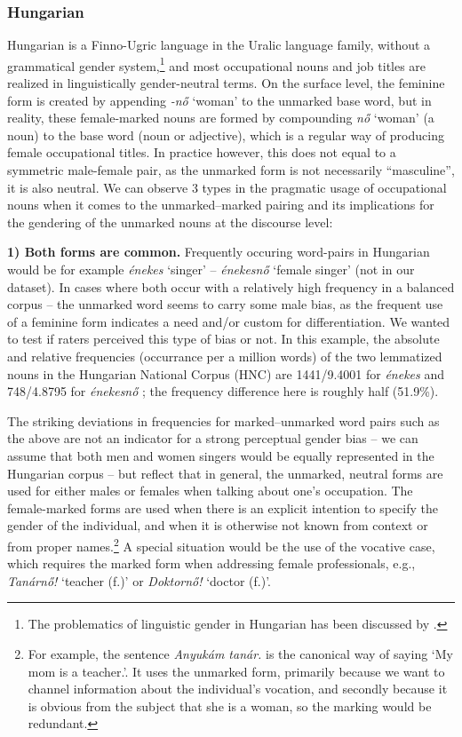 \documentclass[11pt]{article}
\begin{document}
\subsubsection{Hungarian}

Hungarian is a Finno-Ugric language in the Uralic language family, without a grammatical gender system,\footnote{The problematics of linguistic gender in Hungarian has been discussed by \citet{vasvari_2014_problemas}.} and most occupational nouns and job titles are realized in linguistically gender-neutral terms. 
On the surface level, the feminine form is created by appending \textit{-nő} `woman' to the unmarked base word, but in reality, these female-marked nouns are formed by compounding \textit{nő} `woman' (a noun) to the base word (noun or adjective), which is a regular way of producing female occupational titles. In practice however, this does not equal to a symmetric male-female pair, as the unmarked form is not necessarily ``masculine'', it is also neutral. We can observe 3 types in the pragmatic usage of occupational nouns when it comes to the unmarked--marked pairing and its implications for the gendering of the unmarked nouns at the discourse level:

\textbf{1) Both forms are common.} Frequently occuring word-pairs in Hungarian would be for example \textit{énekes} `singer' -- \textit{énekesnő} `female singer' (not in our dataset). In cases where both occur with a relatively high frequency in a balanced corpus -- the unmarked word seems to carry some male bias, as the frequent use of a feminine form indicates a need and/or custom for differentiation. We wanted to test if raters perceived this type of bias or not. In this example, the absolute and relative frequencies (occurrance per a million words) of the two lemmatized nouns in the Hungarian National Corpus (HNC) are 1441/9.4001 for \textit{énekes} and 748/4.8795 for \textit{énekesnő} \citep{varadi_2002_hungarian, oravecz_2014_hungarian}; the frequency difference here is roughly half (51.9\%).

The striking deviations in frequencies for marked--unmarked word pairs such as the above are not an indicator for a strong perceptual gender bias -- we can assume that both men and women singers would be equally represented in the Hungarian corpus -- but reflect that in general, the unmarked, neutral forms are used for either males or females when talking about one's occupation. The female-marked forms are used when there is an explicit intention to specify the gender of the individual, and when it is otherwise not known from context or from proper names.\footnote{For example, the sentence \textit{Anyukám tanár.} is the canonical way of saying `My mom is a teacher.'. It uses the unmarked form, primarily because we want to channel information about the individual's vocation, and secondly because it is obvious from the subject that she is a woman, so the marking would be redundant.} A special situation would be the use of the vocative case, which requires the marked form when addressing female professionals, e.g., \textit{Tanárnő!} `teacher (f.)' or \textit{Doktornő!} `doctor (f.)'.
\end{document}
